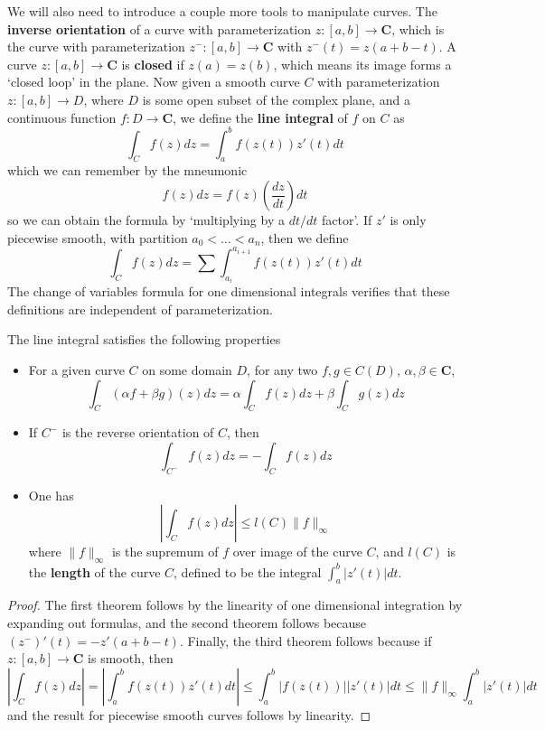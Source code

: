 We will also need to introduce a couple more tools to manipulate curves. The {\bf inverse orientation} of a curve with parameterization $z: [a,b] \to \mathbf{C}$, which is the curve with parameterization $z^-: [a,b] \to \mathbf{C}$ with $z^-(t) = z(a+b-t)$. A curve $z: [a,b] \to \mathbf{C}$ is {\bf closed} if $z(a) = z(b)$, which means its image forms a `closed loop' in the plane. Now given a smooth curve $C$ with parameterization $z: [a,b] \to D$, where $D$ is some open subset of the complex plane, and a continuous function $f: D \to \mathbf{C}$, we define the {\bf line integral} of $f$ on $C$ as
%
\[ \int_C f(z) dz = \int_a^b f(z(t)) z'(t) dt \]
%
which we can remember by the mneumonic
%
\[ f(z) dz = f(z) \left( \frac{dz}{dt} \right) dt \]
%
so we can obtain the formula by `multiplying by a $dt/dt$ factor'. If $z'$ is only piecewise smooth, with partition $a_0 < \dots < a_n$, then we define
%
\[ \int_C f(z) dz = \sum \int_{a_i}^{a_{i+1}} f(z(t)) z'(t) dt \]
%
The change of variables formula for one dimensional integrals verifies that these definitions are independent of parameterization.

\begin{theorem}
    The line integral satisfies the following properties
    \begin{itemize}
        \item For a given curve $C$ on some domain $D$, for any two $f,g \in C(D)$, $\alpha, \beta \in \mathbf{C}$,
        \[ \int_C (\alpha f + \beta g)(z) dz = \alpha \int_C f(z) dz + \beta \int_C g(z) dz \]

        \item If $C^-$ is the reverse orientation of $C$, then
        \[ \int_{C^-} f(z) dz = - \int_C f(z) dz \]

        \item One has
        \[ \left| \int_C f(z) dz \right| \leq l(C) \| f \|_\infty \]
        where $\| f \|_\infty$ is the supremum of $f$ over image of the curve $C$, and $l(C)$ is the {\bf length} of the curve $C$, defined to be the integral $\int_a^b |z'(t)| dt$.
    \end{itemize}
\end{theorem}
\begin{proof}
    The first theorem follows by the linearity of one dimensional integration by expanding out formulas, and the second theorem follows because $(z^-)'(t) = -z'(a+b-t)$. Finally, the third theorem follows because if $z: [a,b] \to \mathbf{C}$ is smooth, then
    \[ \left| \int_C f(z)dz \right| = \left| \int_a^b f(z(t)) z'(t) dt \right| \leq \int_a^b |f(z(t))||z'(t)| dt \leq \| f \|_\infty \int_a^b |z'(t)| dt \]
    and the result for piecewise smooth curves follows by linearity.
\end{proof}

